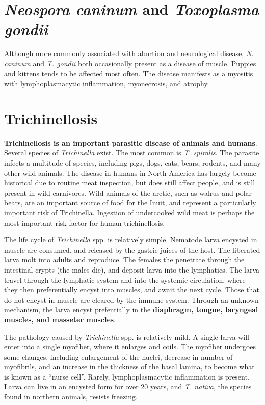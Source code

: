 \documentclass[openany]{report}
\begin{document}
\section{\texorpdfstring{\emph{Neospora caninum} and \emph{Toxoplasma
gondii}}{Neospora caninum and Toxoplasma gondii}}\label{neospora-caninum-and-toxoplasma-gondii}

Although more commonly associated with abortion and neurological
disease, \emph{N. caninum} and \emph{T. gondii} both occasionally
present as a disease of muscle. Puppies and kittens tends to be affected
most often. The disease manifests as a myositis with lymphoplasmacytic
inflammation, myonecrosis, and atrophy.

\section{Trichinellosis}\label{trichinellosis}

\textbf{Trichinellosis is an important parasitic disease of animals and
humans}. Several species of \emph{Trichinella} exist. The most common is
\emph{T. spiralis}. The parasite infects a multitude of species,
including pigs, dogs, cats, bears, rodents, and many other wild animals.
The disease in humans in North America has largely become historical due
to routine meat inspection, but does still affect people, and is still
present in wild carnivores. Wild animals of the arctic, such as walrus
and polar bears, are an important source of food for the Inuit, and
represent a particularly important risk of Trichinella. Ingestion of
undercooked wild meat is perhaps the most important risk factor for
human trichinellosis.

The life cycle of \emph{Trichinella} spp. is relatively simple. Nematode
larva encysted in muscle are consumed, and released by the gastric
juices of the host. The liberated larva molt into adults and reproduce.
The females the penetrate through the intestinal crypts (the males die),
and deposit larva into the lymphatics. The larva travel through the
lymphatic system and into the systemic circulation, where they then
preferentially encyst into muscles, and await the next cycle. Those that
do not encyst in muscle are cleared by the immune system. Through an
unknown mechanism, the larva encyst prefentially in the
\textbf{diaphragm, tongue, laryngeal muscles, and masseter muscles}.

The pathology caused by \emph{Trichinella} spp. is relatively mild. A
single larva will enter into a single myofiber, where it enlarges and
coils. The myofiber undergoes some changes, including enlargement of the
nuclei, decrease in number of myofibrils, and an increase in the
thickness of the basal lamina, to become what is known as a ``nurse
cell''. Rarely, lymphoplasmacytic inflammation is present. Larva can
live in an encysted form for over 20 years, and \emph{T. nativa}, the
species found in northern animals, resists freezing.
\end{document}
